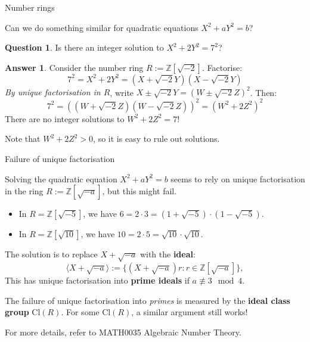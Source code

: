 \documentclass[10pt]{beamer}
\theoremstyle{definition}
\newtheorem{answer}{Answer}
\newtheorem{question}{Question}
\begin{document}
\begin{frame}[t]{Number rings}

Can we do something similar for quadratic equations $ X^2 + aY^2 = b $?

\vspace{0.5cm}

\begin{question}
Is there an integer solution to $ X^2 + 2Y^2 = 7^2 $?
\end{question}

\begin{answer}
Consider the number ring $ R := \mathbb{Z}[\sqrt{-2}] $. Factorise:
$$ 7^2 = X^2 + 2Y^2 = (X + \sqrt{-2}Y)(X - \sqrt{-2}Y) $$
\emph{By unique factorisation in $ R $}, write $ X \pm \sqrt{-2}Y = (W \pm \sqrt{-2}Z)^2 $. Then:
$$ 7^2 = ((W + \sqrt{-2}Z)(W - \sqrt{-2}Z))^2 = (W^2 + 2Z^2)^2 $$
There are no integer solutions to $ W^2 + 2Z^2 = 7 $!
\end{answer}

\vspace{0.5cm} Note that $ W^2 + 2Z^2 > 0 $, so it is easy to rule out solutions.

\end{frame}

\begin{frame}[t]{Failure of unique factorisation}

Solving the quadratic equation $ X^2 + aY^2 = b $ seems to rely on unique factorisation in the ring $ R := \mathbb{Z}[\sqrt{-a}] $, but this might fail.
\begin{examples}
\begin{itemize}
\item In $ R = \mathbb{Z}[\sqrt{-5}] $, we have $ 6 = 2 \cdot 3 = (1 + \sqrt{-5}) \cdot (1 - \sqrt{-5}) $.
\item In $ R = \mathbb{Z}[\sqrt{10}] $, we have $ 10 = 2 \cdot 5 = \sqrt{10} \cdot \sqrt{10} $.
\end{itemize}
\end{examples}
The solution is to replace $ X + \sqrt{-a} $ with the \textbf{ideal}:
$$ \langle X + \sqrt{-a}\rangle := \{(X + \sqrt{-a})r : r \in \mathbb{Z}[\sqrt{-a}]\}, $$
This has unique factorisation into \textbf{prime ideals} if $ a \not\equiv 3 \mod 4 $.

\vspace{0.5cm} The failure of unique factorisation into \emph{primes} is measured by the \textbf{ideal class group} $ \mathrm{Cl}(R) $. For some $ \mathrm{Cl}(R) $, a similar argument still works!

\vspace{0.5cm} For more details, refer to MATH0035 Algebraic Number Theory.

\end{frame}
\end{document}
